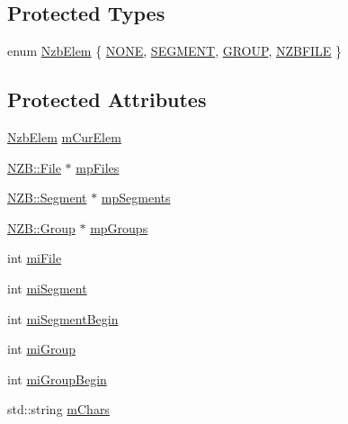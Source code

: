\subsection*{Protected Types}
\begin{DoxyCompactItemize}
\item 
enum \hyperlink{class_n_z_b_1_1_parse_1_1_pass2_parse_handler_a05e6d45260e206949b805d1f8bb24cc5}{Nzb\+Elem} \{ \hyperlink{class_n_z_b_1_1_parse_1_1_pass2_parse_handler_a05e6d45260e206949b805d1f8bb24cc5aaa618133f4061942ff5b37fd61c800c2}{N\+O\+NE}, 
\hyperlink{class_n_z_b_1_1_parse_1_1_pass2_parse_handler_a05e6d45260e206949b805d1f8bb24cc5a744ce3f7aac22b510695bbe70802fc99}{S\+E\+G\+M\+E\+NT}, 
\hyperlink{class_n_z_b_1_1_parse_1_1_pass2_parse_handler_a05e6d45260e206949b805d1f8bb24cc5a66293d68619d407485329c5ce517f19e}{G\+R\+O\+UP}, 
\hyperlink{class_n_z_b_1_1_parse_1_1_pass2_parse_handler_a05e6d45260e206949b805d1f8bb24cc5ab4ed997bce5cb2f78291e2c277e68e21}{N\+Z\+B\+F\+I\+LE}
 \}
\end{DoxyCompactItemize}
\subsection*{Protected Attributes}
\begin{DoxyCompactItemize}
\item 
\hyperlink{class_n_z_b_1_1_parse_1_1_pass2_parse_handler_a05e6d45260e206949b805d1f8bb24cc5}{Nzb\+Elem} \hyperlink{class_n_z_b_1_1_parse_1_1_pass2_parse_handler_a9c826c2393e2f8d76d8ee1d0a126368e}{m\+Cur\+Elem}
\item 
\hyperlink{class_n_z_b_1_1_file}{N\+Z\+B\+::\+File} $\ast$ \hyperlink{class_n_z_b_1_1_parse_1_1_pass2_parse_handler_aed1cb652f2f9f66446634b487c88f2d0}{mp\+Files}
\item 
\hyperlink{class_n_z_b_1_1_segment}{N\+Z\+B\+::\+Segment} $\ast$ \hyperlink{class_n_z_b_1_1_parse_1_1_pass2_parse_handler_af89a59538b17bf8b840e71c95c97f810}{mp\+Segments}
\item 
\hyperlink{class_n_z_b_1_1_group}{N\+Z\+B\+::\+Group} $\ast$ \hyperlink{class_n_z_b_1_1_parse_1_1_pass2_parse_handler_a04f7ef1c4c7547c15c49d81e7c404f85}{mp\+Groups}
\item 
int \hyperlink{class_n_z_b_1_1_parse_1_1_pass2_parse_handler_aac119e2e3690065b009cd53c21702ec6}{mi\+File}
\item 
int \hyperlink{class_n_z_b_1_1_parse_1_1_pass2_parse_handler_aac2dbf285dc01b72a7cda4e883fcb5b9}{mi\+Segment}
\item 
int \hyperlink{class_n_z_b_1_1_parse_1_1_pass2_parse_handler_afd21564b9f52f71c12e6335140b849bd}{mi\+Segment\+Begin}
\item 
int \hyperlink{class_n_z_b_1_1_parse_1_1_pass2_parse_handler_a126d86f68bf8209f2f7b3aa6e9048bc3}{mi\+Group}
\item 
int \hyperlink{class_n_z_b_1_1_parse_1_1_pass2_parse_handler_afa0b65267cec4fcf26ca934a66c3cc06}{mi\+Group\+Begin}
\item 
std\+::string \hyperlink{class_n_z_b_1_1_parse_1_1_pass2_parse_handler_a3e2bb4640047a0aa35ab93fb1a25465b}{m\+Chars}
\end{DoxyCompactItemize}


